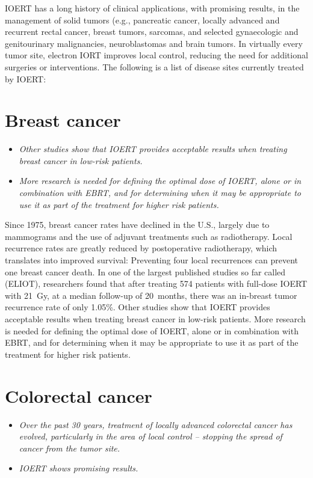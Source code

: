 IOERT has a long history of clinical applications, with promising
results, in the management of solid tumors (e.g., pancreatic cancer,
locally advanced and recurrent rectal cancer, breast tumors, sarcomas,
and selected gynaecologic and genitourinary malignancies, neuroblastomas
and brain tumors. In virtually every tumor site, electron IORT improves
local control, reducing the need for additional surgeries or
interventions. The following is a list of disease sites currently
treated by IOERT:

\section{Breast cancer}\label{breast-cancer}

\begin{itemize}
\item
  \emph{Other studies show that IOERT provides acceptable results when
  treating breast cancer in low-risk patients.}
\item
  \emph{More research is needed for defining the optimal dose of IOERT,
  alone or in combination with EBRT, and for determining when it may be
  appropriate to use it as part of the treatment for higher risk
  patients.}
\end{itemize}

Since 1975, breast cancer rates have declined in the U.S., largely due
to mammograms and the use of adjuvant treatments such as radiotherapy.
Local recurrence rates are greatly reduced by postoperative
radiotherapy, which translates into improved survival: Preventing four
local recurrences can prevent one breast cancer death. In one of the
largest published studies so far called (ELIOT), researchers found that
after treating 574 patients with full-dose IOERT with 21~Gy, at a median
follow-up of 20~months, there was an in-breast tumor recurrence rate of
only 1.05\%. Other studies show that IOERT provides acceptable results
when treating breast cancer in low-risk patients. More research is
needed for defining the optimal dose of IOERT, alone or in combination
with EBRT, and for determining when it may be appropriate to use it as
part of the treatment for higher risk patients.

\section{Colorectal cancer}\label{colorectal-cancer}

\begin{itemize}
\item
  \emph{Over the past 30 years, treatment of locally advanced colorectal
  cancer has evolved, particularly in the area of local control --
  stopping the spread of cancer from the tumor site.}
\item
  \emph{IOERT shows promising results.}
\end{itemize}

